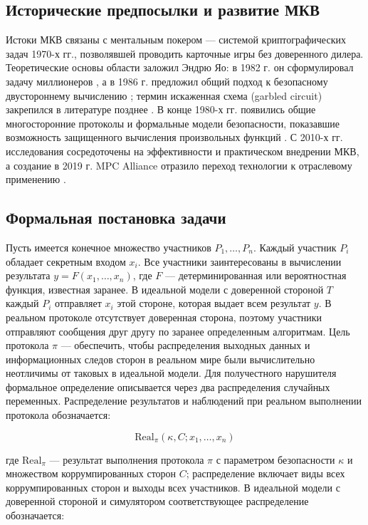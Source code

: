 \subsection{Исторические предпосылки и развитие МКВ}

Истоки МКВ связаны с ментальным покером --- системой криптографических задач 1970-х гг., позволявшей проводить карточные игры без доверенного дилера. Теоретические основы области заложил Эндрю Яо: в 1982 г. он сформулировал задачу миллионеров \cite{14}, а в 1986 г. предложил общий подход к безопасному двустороннему вычислению \cite{15}; термин искаженная схема (garbled circuit) закрепился в литературе позднее \cite{16}. В конце 1980-х гг. появились общие многосторонние протоколы и формальные модели безопасности, показавшие возможность защищенного вычисления произвольных функций \cite{06}\cite{08}. С 2010-х гг. исследования сосредоточены на эффективности и практическом внедрении МКВ, а создание в 2019 г. MPC Alliance отразило переход технологии к отраслевому применению \cite{19}.

\subsection{Формальная постановка задачи}
\label{subsec:formal-statement}

Пусть имеется конечное множество участников \(P_{1},\ldots,P_{n}\). Каждый участник \(P_{i}\) обладает секретным входом \(x_{i}\). Все участники заинтересованы в вычислении результата \(y=F(x_{1},\ldots,x_{n})\), где \(F\) --- детерминированная или вероятностная функция, известная заранее. В идеальной модели с доверенной стороной \(T\) каждый \(P_{i}\) отправляет \(x_{i}\) этой стороне, которая выдает всем результат \(y\). В реальном протоколе отсутствует доверенная сторона, поэтому участники отправляют сообщения друг другу по заранее определенным алгоритмам. Цель протокола \(\pi\) --- обеспечить, чтобы распределения выходных данных и информационных следов сторон в реальном мире были вычислительно неотличимы от таковых в идеальной модели. Для получестного нарушителя формальное определение описывается через два распределения случайных переменных. Распределение результатов и наблюдений при реальном выполнении протокола обозначается:

\begin{equation}
\mathrm{Real}_{\pi}(\kappa, C; x_{1},\ldots,x_{n})
\end{equation}

где \(\mathrm{Real}_{\pi}\) --- результат выполнения протокола \(\pi\) с параметром безопасности \(\kappa\) и множеством коррумпированных сторон \(C\); распределение включает виды всех коррумпированных сторон и выходы всех участников. В идеальной модели с доверенной стороной и симулятором соответствующее распределение обозначается:


